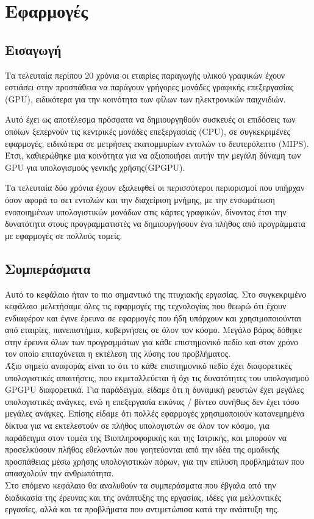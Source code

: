 \chapter{Εφαρμογές}
\section{Εισαγωγή}
Τα τελευταία περίπου 20 χρόνια οι εταιρίες παραγωγής υλικού γραφικών έχουν εστιάσει στην προσπάθεια να παράγουν γρήγορες μονάδες γραφικής επεξεργασίας (GPU), ειδικότερα για την κοινότητα των φίλων των ηλεκτρονικών παιχνιδιών.

Αυτό έχει ως αποτέλεσμα πρόσφατα να δημιουργηθούν συσκευές οι επιδόσεις των οποίων ξεπερνούν τις κεντρικές μονάδες επεξεργασίας (CPU), σε συγκεκριμένες εφαρμογές, ειδικότερα σε μετρήσεις εκατομμυρίων εντολών το δευτερόλεπτο (MIPS). Έτσι, καθιερώθηκε μια κοινότητα για να αξιοποιήσει αυτήν την μεγάλη δύναμη των GPU για υπολογισμούς γενικής χρήσης(GPGPU). 

Τα τελευταία δύο χρόνια έχουν εξαλειφθεί οι περισσότεροι περιορισμοί που υπήρχαν όσον αφορά το σετ εντολών και την διαχείριση μνήμης, με την ενσωμάτωση ενοποιημένων υπολογιστικών μονάδων στις κάρτες γραφικών, δίνοντας έτσι την δυνατότητα στους προγραμματιστές να δημιουργήσουν ένα πλήθος από προγράμματα με εφαρμογές σε πολλούς τομείς.










\section{Συμπεράσματα}
Αυτό το κεφάλαιο ήταν το πιο σημαντικό της πτυχιακής εργασίας. Στο συγκεκριμένο κεφάλαιο μελετήσαμε όλες τις εφαρμογές της τεχνολογίας που θεωρώ ότι έχουν ενδιαφέρον και έγινε έρευνα σε εφαρμογές που ήδη υπάρχουν και χρησιμοποιούνται από εταιρίες, πανεπιστήμια, κυβερνήσεις σε όλον τον κόσμο. Μεγάλο βάρος δόθηκε στην έρευνα όλων των προγραμμάτων για κάθε επιστημονικό πεδίο και στον χρόνο τον οποίο επιταχύνεται η εκτέλεση της λύσης του προβλήματος.\\

Άξιο σημείο αναφοράς είναι το ότι το κάθε επιστημονικό πεδίο έχει διαφορετικές υπολογιστικές απαιτήσεις, που εκμεταλλεύεται ή όχι τις δυνατότητες του υπολογισμού GPGPU διαφορετικά. Για παράδειγμα, είδαμε ότι η δυναμική ρευστών έχει μεγάλες υπολογιστικές ανάγκες, ενώ η επεξεργασία εικόνας / βίντεο συνήθως δεν έχει τόσο μεγάλες ανάγκες. Επίσης είδαμε ότι πολλές εφαρμογές χρησιμοποιούν κατανεμημένα δίκτυα για να εκτελεστούν σε πλήθος υπολογιστών σε όλον τον κόσμο, για παράδειγμα στον τομέα της Βιοπληροφορικής και της Ιατρικής, και μπορούν να προσελκύσουν πλήθος εθελοντών που γοητεύονται από την ιδέα της ομαδικής προσπάθειας μέσω χρήσης υπολογιστικών πόρων, για την επίλυση προβλημάτων που απασχολούν την ανθρωπότητα.\\

Στο επόμενο κεφάλαιο θα αναλυθούν τα συμπεράσματα που έβγαλα από την διαδικασία της έρευνας και της ανάπτυξης της εργασίας, ιδέες για μελλοντικές εργασίες, αλλά και τα προβλήματα που αντιμετώπισα κατά την ανάπτυξη της.